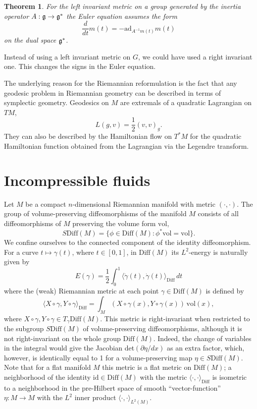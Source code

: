 \documentclass{article}
\theoremstyle{plain}
\newtheorem{teo}{Theorem}[section]
\theoremstyle{definition}
\numberwithin{equation}{section}
\newcommand{\Diff}{\ensuremath{\mathrm{Diff}}}
\newcommand{\Vol}{\ensuremath{\mathrm{vol}}}
\newcommand{\id}{\ensuremath{\mathrm{id}}}
\newcommand{\ad}{\ensuremath{\mathrm{ad}}}
\newcommand{\mf}{\ensuremath{\mathfrak}}
\begin{document}
\begin{teo}
For the left invariant metric on a group  generated by the inertia operator $A:\mf g\to \mf g^*$ the Euler equation assumes the form
\[
\frac{d}{dt}m(t)=-\ad_{A^{-1}m(t)}m(t)
\]
on the dual space $\mf g^*$.
\end{teo}

Instead of using a left invariant metric on $G$, we could have
used a right invariant one. This changes the signs in the Euler equation.

The underlying reason for the Riemannian reformulation is
the fact that any geodesic problem in Riemannian geometry can be described
in terms of symplectic geometry. Geodesics on $M$ are extremals of a quadratic
Lagrangian on $TM$,
\[
L(g,v)=\frac{1}{2}(v,v)_g.
\]
They can also be described by the Hamiltonian flow on $T^*M$ for the quadratic Hamiltonian function obtained from the Lagrangian via the Legendre transform.

\section{Incompressible fluids}
Let $M$ be a compact $n$-dimensional Riemannian manifold with metric $(\cdot,\cdot)$. The group of volume-preserving diffeomorphisms of the manifold $M$ consists of all diffeomorphisms of $M$ preserving the volume form $\Vol$,
\[
S\Diff(M)=\{\phi\in\Diff(M): \phi^*\Vol=\Vol\}.
\]
We confine ourselves to the connected component of the identity diffeomorphism. For a curve $t\mapsto \gamma(t)$, where $t\in[0,1]$, in $\Diff(M)$ its $L^2$-energy is naturally given by
\[
  E(\gamma)=\frac{1}{2}\int_0^1\langle \dot{\gamma}(t),\dot{\gamma}(t)\rangle_\Diff\,dt
\]
where the (weak) Riemannian metric at each point $\gamma\in\Diff(M)$ is defined by
%
\begin{equation}
\label{eq:weakmetric}
\langle X\circ \gamma,Y\circ \gamma\rangle_\Diff = \int_M(X\circ \gamma(x),Y\circ \gamma(x))\,\Vol(x),
\end{equation}
%
where $X\circ\gamma,Y\circ\gamma\in T_\gamma\Diff(M)$.
This metric is right-invariant when restricted to the subgroup $S\Diff(M)$ of
volume-preserving diffeomorphisms, although it is not right-invariant on the
whole group $\Diff(M)$. Indeed, the change of variables in the integral
would give the Jacobian det$(\partial \eta/dx)$ as an extra factor, which, however, is identically equal to 1 for a volume-preserving map $\eta\in S\Diff(M)$. Note that for a flat manifold $M$ this metric is a flat metric on $\Diff(M)$; a neighborhood of the identity $\id\in\Diff(M)$ with the metric $\langle\cdot,\cdot\rangle_\Diff$ is isometric to a neighborhood in the pre-Hilbert space of smooth ``vector-function'' $\eta:M\to M$ with the $L^2$ inner product $\langle\cdot,\cdot\rangle_{L^2(M)}$.

\newpage

\end{document}
